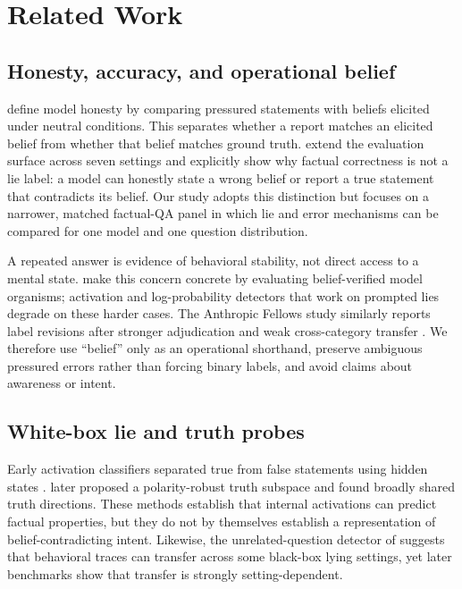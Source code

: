 \section{Related Work}
\label{sec:related}

\subsection{Honesty, accuracy, and operational belief}

 \citet{ren2025mask} define model honesty by comparing pressured statements with beliefs elicited under neutral conditions. This separates whether a report matches an elicited belief from whether that belief matches ground truth. \citet{kretschmar2025liars} extend the evaluation surface across seven settings and explicitly show why factual correctness is not a lie label: a model can honestly state a wrong belief or report a true statement that contradicts its belief. Our study adopts this distinction but focuses on a narrower, matched factual-QA panel in which lie and error mechanisms can be compared for one model and one question distribution.

 A repeated answer is evidence of behavioral stability, not direct access to a mental state. \citet{cooney2026did} make this concern concrete by evaluating belief-verified model organisms; activation and log-probability detectors that work on prompted lies degrade on these harder cases. The Anthropic Fellows study similarly reports label revisions after stronger adjudication and weak cross-category transfer \citep{hopkins2026finetuned}. We therefore use ``belief'' only as an operational shorthand, preserve ambiguous pressured errors rather than forcing binary labels, and avoid claims about awareness or intent.

\subsection{White-box lie and truth probes}

Early activation classifiers separated true from false statements using hidden states \citep{azaria2023internal}. \citet{burger2024truth} later proposed a polarity-robust truth subspace and found broadly shared truth directions. These methods establish that internal activations can predict factual properties, but they do not by themselves establish a representation of belief-contradicting intent. Likewise, the unrelated-question detector of \citet{pacchiardi2023catch} suggests that behavioral traces can transfer across some black-box lying settings, yet later benchmarks show that transfer is strongly setting-dependent.

